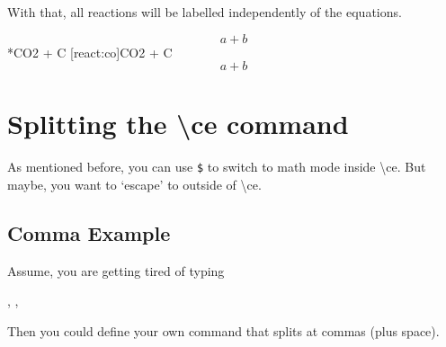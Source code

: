 \documentclass[a4paper,notitlepage,parskip=half]{scrreprt}
\newcommand\macro[1]{{\ttfamily\textbackslash#1}}
\begin{document}
With that, all reactions will be labelled independently of the equations.

\makeatletter
{}
\renewcommand\thereaction{C\,\thechapter.\arabic{reaction}}
\newcommand\reactiontag%
  {\refstepcounter{reaction}\tag{\thereaction}}
\renewcommand\reaction@[2][]%
  {\begin{equation}\ce{#2}%
  \ifx\@empty#1\@empty\else\label{#1}\fi%
  \reactiontag\end{equation}}
\renewcommand\reaction@nonumber[1]%
  {\begin{equation*}\ce{#1}\end{equation*}}
\renewcommand\reaction%
  {\@ifstar{\reaction@nonumber}{\reaction@}}
\makeatother
\begin{SideBySideExample}[xrightmargin=6.5cm]
  \begin{equation}a+b\end{equation}
  \reaction{CO2 + C}
  \reaction*{CO2 + C}
  \reaction[react:co]{CO2 + C}
  \begin{equation}a+b\end{equation}
\end{SideBySideExample}



\section{Splitting the \macro{ce} command}

As mentioned before, you can use  \verb|$| to switch to math mode inside \macro{ce}. But maybe, you want to `escape' to outside of \macro{ce}.


\subsection{Comma Example}

Assume, you are getting tired of typing

\begin{SideBySideExample}[xrightmargin=4cm]
  , , 
\end{SideBySideExample}

Then you could define your own command that splits at commas (plus space).

\begin{SideBySideExample}[xrightmargin=4cm]
  \newcommand*\cec[1]{\cesplit{{\,\ }{\0}}{#1}}
  \cec{N2, O2, CO2}
\end{SideBySideExample}
\end{document}
